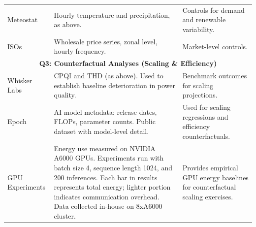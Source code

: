 \documentclass[sigconf,authordraft]{acmart}
\begin{document}
\begin{table}
{\begin{threeparttable}
\begin{tabularx}{\linewidth}{lXl}
Meteostat & Hourly temperature and precipitation, as above. & Controls for demand and renewable variability. \\
ISOs & Wholesale price series, zonal level, hourly frequency. & Market-level controls. \\
\midrule
\multicolumn{3}{c}{\textbf{Q3: Counterfactual Analyses (Scaling \& Efficiency)}} \\
\midrule
Whisker Labs & CPQI and THD (as above). Used to establish baseline deterioration in power quality. & Benchmark outcomes for scaling projections. \\
Epoch & AI model metadata: release dates, FLOPs, parameter counts. Public dataset with model-level detail. & Used for scaling regressions and efficiency counterfactuals. \\
GPU Experiments & Energy use measured on NVIDIA A6000 GPUs. Experiments run with batch size 4, sequence length 1024, and 200 inferences. Each bar in results represents total energy; lighter portion indicates communication overhead. Data collected in-house on 8xA6000 cluster. & Provides empirical GPU energy baselines for counterfactual scaling exercises. \\
\bottomrule
\end{tabularx}
\end{threeparttable}}
\end{table}
\end{document}
